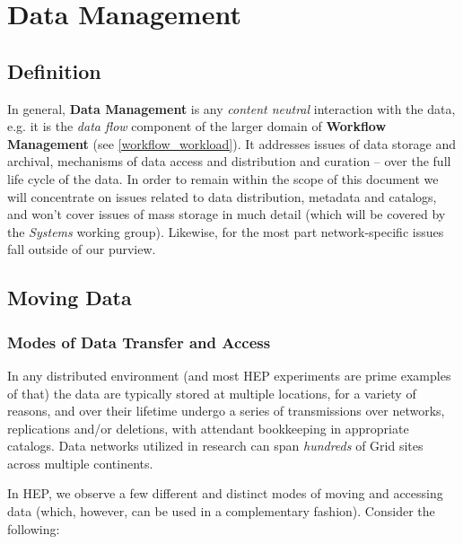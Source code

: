 \section{Data Management}
\label{data}


\subsection{Definition}
In general, \textbf{Data Management} is any \textit{content neutral} interaction with the data, e.g. it is the \textit{data flow}
component of the larger domain of  \textbf{Workflow Management} (see \ref{workflow_workload}). It addresses issues of data storage
and archival, mechanisms of data access and distribution and  curation -- over the full life cycle of the data. In order to remain within
the scope of this document we will
concentrate on issues related to data distribution, metadata and catalogs, and won't cover issues of mass storage
in much detail (which will be covered by the \textit{Systems} working group). Likewise, for the most part network-specific issues fall outside of our purview.



\subsection{Moving Data}
\subsubsection{Modes of Data Transfer and Access}
\label{data_xfer}
In any distributed environment (and most HEP experiments are prime examples of that) the data are typically stored at multiple locations,
for a variety of reasons, and over their lifetime undergo a series of transmissions over networks, replications and/or deletions, with attendant bookkeeping
in appropriate catalogs. Data networks utilized in research can span \textit{hundreds} of Grid sites across multiple continents.

In HEP, we observe a few different and distinct modes of moving and accessing data (which, however, can be used in a complementary fashion).
Consider the following:

